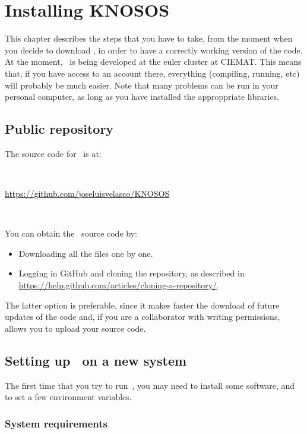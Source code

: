\chapter{Installing {\ttfamily KNOSOS}}\label{CHAP_INST}

This chapter describes the steps that you have to take, from the moment when you decide to download \KNOSOS, in order to have a correctly working version of the code. At the moment, \KNOSOS~is being developed at the {\ttfamily euler} cluster at CIEMAT. This means that, if you have access to an account there, everything (compiling, running, etc) will probably be much easier. Note that many problems can be run in your personal computer, as long as you have installed the approppriate libraries.


\section{Public repository}

The source code for \KNOSOS~is  at:

\

 \url{https://github.com/joseluisvelasco/KNOSOS}

\

You can obtain the \KNOSOS~source code by:
\begin{itemize}
\item Downloading all the files one by one.
\item Logging in {\ttfamily GitHub} and cloning the repository, as described in\\ \url{https://help.github.com/articles/cloning-a-repository/}.
\end{itemize}

The latter option is preferable, since it makes faster the download of future updates of the code and, if you are a collaborator with writing permissions, allows you to upload your source code.


\section{Setting up \KNOSOS~on a new system}

The first time that you try to run~\KNOSOS, you may need to install some software, and to set a few environment variables.

\subsection{System requirements}

